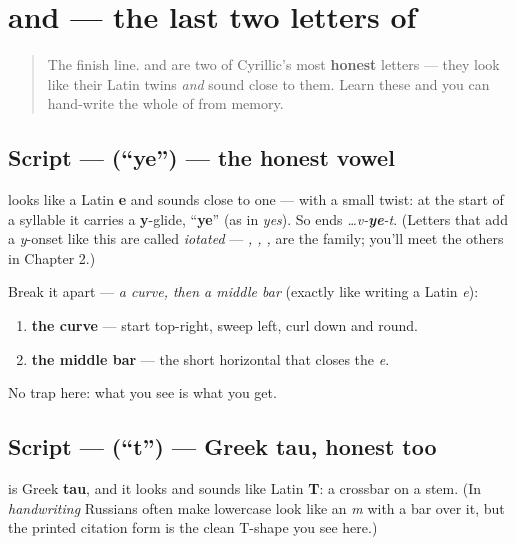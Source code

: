 \section[\texorpdfstring{\ru{е}, \ru{т} (e, t)}{е, т (e, t)}]{ and  — the last two letters of }

\label{lesson:RU-W05-privet-letters-e-t}



\begin{quote}
The finish line. \textbf{} and \textbf{} are two of Cyrillic's most \textbf{honest} letters — they look like their Latin twins \emph{and} sound close to them. Learn these and you can hand-write the whole of \emph{} from memory.
\end{quote}

\subsection*{Script —  (\textquotedblleft{}ye\textquotedblright{}) — the honest vowel}
\textbf{} looks like a Latin \textbf{e} and sounds close to one — with a small twist: at the start of a syllable it carries a \textbf{y}-glide, \textquotedblleft{}\textbf{ye}\textquotedblright{} (as in \emph{yes}). So \emph{} ends \emph{…v-\textbf{ye}-t}. (Letters that add a \emph{y}-onset like this are called \emph{iotated} — \emph{, , , } are the family; you'll meet the others in Chapter 2.)

Break it apart — \emph{a curve, then a middle bar} (exactly like writing a Latin \emph{e}):

\begin{enumerate}
\raggedright
  \item \textbf{the curve} — start top-right, sweep left, curl down and round.
  \item \textbf{the middle bar} — the short horizontal that closes the \emph{e}.
\end{enumerate}

No trap here: what you see is what you get.

\subsection*{Script —  (\textquotedblleft{}t\textquotedblright{}) — Greek tau, honest too}
\textbf{} is Greek \textbf{tau}, and it looks and sounds like Latin \textbf{T}: a crossbar on a stem. (In \emph{handwriting} Russians often make lowercase \emph{} look like an \emph{m} with a bar over it, but the printed citation form is the clean T-shape you see here.)

